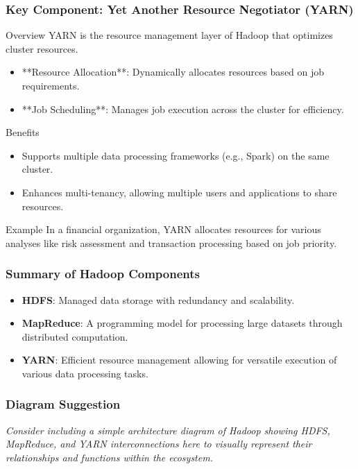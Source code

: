 \documentclass[aspectratio=169]{beamer}
\begin{document}
\begin{frame}[fragile]
    \frametitle{Key Component: Yet Another Resource Negotiator (YARN)}
    \begin{block}{Overview}
        YARN is the resource management layer of Hadoop that optimizes cluster resources.
    \end{block}
    \begin{itemize}
        \item **Resource Allocation**: Dynamically allocates resources based on job requirements.
        \item **Job Scheduling**: Manages job execution across the cluster for efficiency.
    \end{itemize}
    \begin{block}{Benefits}
        \begin{itemize}
            \item Supports multiple data processing frameworks (e.g., Spark) on the same cluster.
            \item Enhances multi-tenancy, allowing multiple users and applications to share resources.
        \end{itemize}
    \end{block}
    \begin{block}{Example}
        In a financial organization, YARN allocates resources for various analyses like risk assessment and transaction processing based on job priority.
    \end{block}
\end{frame}

\begin{frame}[fragile]
    \frametitle{Summary of Hadoop Components}
    \begin{itemize}
        \item \textbf{HDFS}: Managed data storage with redundancy and scalability.
        \item \textbf{MapReduce}: A programming model for processing large datasets through distributed computation.
        \item \textbf{YARN}: Efficient resource management allowing for versatile execution of various data processing tasks.
    \end{itemize}
\end{frame}

\begin{frame}[fragile]
    \frametitle{Diagram Suggestion}
    \centering
    \textit{Consider including a simple architecture diagram of Hadoop showing HDFS, MapReduce, and YARN interconnections here to visually represent their relationships and functions within the ecosystem.}
\end{frame}
\end{document}
